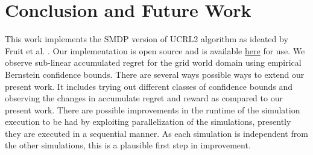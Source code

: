 
\chapter{Conclusion and Future Work}

This work implements the SMDP version of UCRL2 algorithm as ideated by Fruit et al. \cite{fruit_regret_2017}.
Our implementation is open source and is available \href{https://github.com/say4n/options}{here} for use.
We observe sub-linear accumulated regret for the grid world domain using empirical Bernstein confidence bounds.
There are several ways possible ways to extend our present work.
It includes trying out different classes of confidence bounds and observing the changes in accumulate regret and reward as compared to our present work.
There are possible improvements in the runtime of the simulation execution to be had by exploiting parallelization of the simulations, presently they are executed in a sequential manner.
As each simulation is independent from the other simulations, this is a plausible first step in improvement.

\newpage
